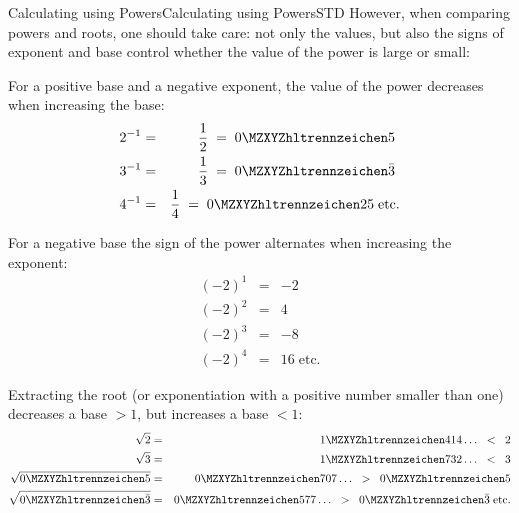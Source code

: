 \begin{MXContent}{Calculating using Powers}{Calculating using Powers}{STD}
However, when comparing powers and roots, one should take care: not only the values, but also the signs of exponent and base
control whether the value of the power is large or small:

\begin{MExample}
For a positive base and a negative exponent, 
the value of the power decreases when increasing the base:
\begin{eqnarray*}
2^{-1} &=& \frac12\;=\; \MZahl{0}{5}\ \\
3^{-1} &=& \frac13\;=\; \MZahl{0}{}\bar 3\ \\
4^{-1} &=& \frac14\;=\; \MZahl{0}{25}\; \text{etc.}
\end{eqnarray*}

For a negative base the sign of the power alternates when increasing the exponent:
\begin{eqnarray*}
(-2)^1 &=& -2\\
(-2)^2 &=& 4\\
(-2)^3 &=& -8\\
(-2)^4 &=& 16 \; \text{etc.}
\end{eqnarray*}

Extracting the root (or exponentiation with a positive number smaller than one) decreases 
a base $>1$, but increases a base $<1$:
\begin{eqnarray*}
\sqrt{2} &=& \MZahl{1}{414}\ldots\;\; < \;\; 2\\
\sqrt{3} &=& \MZahl{1}{732}\ldots\;\; < \;\; 3\\
\sqrt{\MZahl{0}{5}} &=& \MZahl{0}{707}\ldots\;\; > \;\; \MZahl{0}{5}\\
\sqrt{\MZahl{0}{}\bar 3} &=& \MZahl{0}{577}\ldots\;\; > \;\; \MZahl{0}{}\bar 3\;\text{etc.}
\end{eqnarray*}

\end{MExample}


\end{MXContent}

